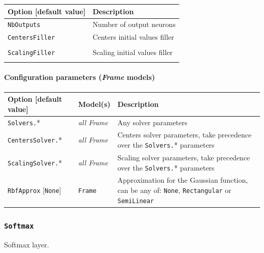 \documentclass[a4paper,11pt,oneside]{article}
\begin{document}
\begin{center}
 \begin{longtable}{| p{5cm} | p{10cm} | }
 \hline
 Option [default value] & Description\\
 \hline\hline
  \cellcolor{requiredcolor}\lstinline!NbOutputs! & Number of output neurons \\
  \lstinline!CentersFiller! & Centers initial values filler \\
   & \\
  \lstinline!ScalingFiller! & Scaling initial values filler \\
   & \\
 \hline
\end{longtable}
\end{center}


\paragraph{Configuration parameters (\emph{Frame} models)}

\begin{center}
 \begin{longtable}{| p{4cm} | p{3cm} | p{9cm} | }
 \hline
 Option [default value] & Model(s) & Description\\
 \hline\hline
  \lstinline!Solvers.!* & \emph{all Frame} & Any solver parameters \\
  \lstinline!CentersSolver.!* & \emph{all Frame} & Centers solver parameters,
  take precedence over the \lstinline!Solvers.!* parameters \\
  \lstinline!ScalingSolver.!* & \emph{all Frame} & Scaling solver parameters,
  take precedence over the \lstinline!Solvers.!* parameters \\
  \lstinline!RbfApprox! [\lstinline!None!] & \lstinline!Frame! & Approximation
  for the Gaussian function, can be any of: \lstinline!None!,
  \lstinline!Rectangular! or \lstinline!SemiLinear! \\
 \hline
\end{longtable}
\end{center}

\subsubsection{\texorpdfstring{%
\lstinline[basicstyle=\ttfamily\bfseries]!Softmax!}{Softmax}}
Softmax layer.
\end{document}
